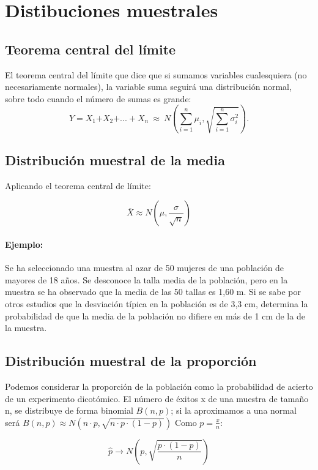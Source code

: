 \section{Distibuciones muestrales}

\subsection{Teorema central del límite}

El teorema central del límite que dice que si sumamos variables cualesquiera (no necesariamente normales), la variable suma seguirá una distribución normal, sobre todo cuando el número de sumas es grande:
$$Y\mathrm{=}X_{\mathrm{1}}\mathrm{+}X_{\mathrm{2}}\mathrm{+...+}X_n\ \mathrm{\approx }\ N\left(\sum^n_{i\mathrm{=1}}{}{\mu }_i,\sqrt{\sum^n_{i\mathrm{=1}}{}{\sigma }^{\mathrm{2}}_i}\right).$$

\subsection{Distribución muestral de la media }
Aplicando el teorema central de límite:

$$\overline{X} \approx N\left(\mu,\frac{\sigma}{\sqrt{n}}\right)$$

\paragraph{Ejemplo:}
 Se ha seleccionado una muestra al azar de 50 mujeres de una población de mayores
de 18 años. Se desconoce la talla media de la población, pero en la muestra se ha
observado que la media de las 50 tallas es 1,60 m. Si se sabe por otros estudios que
la desviación típica en la población es de 3,3 cm, determina la probabilidad de que la
media de la población no difiere en más de 1 cm de la de la muestra. 
\subsection{Distribución muestral de la proporción}

Podemos considerar la proporción de la población como la probabilidad de acierto de un experimento dicotómico.
El número de éxitos x de una muestra de tamaño n, se distribuye de forma binomial $B(n, p)$; si la aproximamos a una normal será $B(n, p) \approx N( n\cdot p, \sqrt{n\cdot p \cdot (1-p)})$  Como $p = \frac{x}{n}$:

$$\widehat{p} \rightarrow N \left ( p , \sqrt{ \frac{p \cdot (1-p)} {n}}\right )$$

